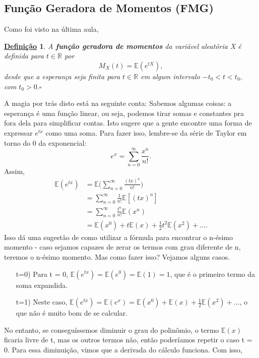 \documentclass{article}
\newtheorem*{def*}{\underline{Defini\c c\~ao}}
\begin{document}
\subsection{Função Geradora de Momentos (FMG)}
Como foi visto na última aula, 
\begin{def*}
  A \textbf{função geradora de momentos} da variável aleatória X é definida para \(t\in \mathbb{R}\) por 
  \[
    M_{X}(t) = \mathbb{E}(e^{tX}),
  \]
  desde que a esperança seja finita para \(t\in \mathbb{R}\) em algum intervalo \(-t_{0} < t < t_{0},\) com \(t_{0} > 0.\square\)
\end{def*}
A magia por trás disto está na seguinte conta: 
Sabemos algumas coisas: a esperança é uma função linear, ou seja, podemos tirar somas e constantes pra fora dela para simplificar contas.
Isto sugere que a gente encontre uma forma de expressar \(e^{tx}\) como uma soma. Para fazer isso, lembre-se da série de Taylor em torno do 0 da exponencial:
\[
  e^{x} = \sum\limits_{n=0}^{\infty}\frac{x^{n}}{n!}.
\]
Assim, 
\begin{align*}
  \mathbb{E}(e^{tx}) &= \mathbb{E}\biggl(\sum\limits_{n=0}^{\infty}\frac{(tx)^{n}}{n!}\biggr)\\
                     &= \sum\limits_{n=0}^{\infty}\frac{1}{n!}\mathbb{E}[(tx)^{n}]\\
                     &= \sum\limits_{n=0}^{\infty}\frac{t^{n}}{n!}\mathbb{E}(x^{n})\\
                     &= \mathbb{E}(x^{0}) + t \mathbb{E}(x) + \frac{1}{2}t^{2} \mathbb{E}(x^{2}) + \dotsc.
\end{align*}
Isso dá uma sugestão de como utilizar a fórmula para encontrar o n-ésimo momento - caso sejamos capazes de zerar os termos com grau diferente de n,
teremos o n-ésimo momento. Mas como fazer isso? Vejamos alguns casos.
\begin{itemize}
  \item[t=0)] Para t = 0, \(\mathbb{E}(e^{tx}) = \mathbb{E}(e^{0}) = \mathbb{E}(1) = 1\), que é o primeiro termo da soma expandida.
  \item[t=1)] Neste caso, \(\mathbb{E}(e^{tx}) = \mathbb{E}(e^{x}) = \mathbb{E}(x^{0}) + \mathbb{E}(x) + \frac{1}{2}\mathbb{E}(x^{2}) + \dotsc\), o que não
    é muito bom de se calcular. 
\end{itemize}
No entanto, se conseguíssemos diminuir o grau do polinômio, o termo \(\mathbb{E}(x)\) ficaria livre de t, mas os outros termos não,
então poderíamos repetir o caso t = 0. Para essa diminuição, vimos que a derivada do cálculo funciona. Com isso, 
\end{document}
